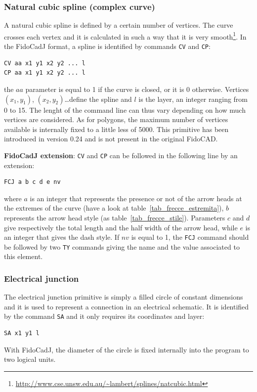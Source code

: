 \documentclass[10pt,a4paper,twoside]{scrreprt}
\begin{document}
\subsubsection{Natural cubic spline (complex curve)}
A natural cubic spline is defined by a certain number of vertices. The curve crosses each vertex and it is calculated in such a way that it is very smooth\footnote{ \href{http://www.cse.unsw.edu.au/~lambert/splines/natcubic.html}{http://www.cse.unsw.edu.au/\textasciitilde lambert/splines/natcubic.html}}. In the FidoCadJ format, a spline is identified by commands \lstinline!CV! and \lstinline!CP!:
\begin{lstlisting}
CV aa x1 y1 x2 y2 ... l
CP aa x1 y1 x2 y2 ... l
\end{lstlisting}
the $aa$ parameter is equal to 1 if the curve is closed, or it is 0 otherwise. Vertices $(x_1, y_1)$, $(x_2, y_2)$\dots define the spline and $l$ is the layer, an integer ranging from 0 to 15.
The lenght of the command line can thus vary depending on how much vertices are considered.
As for polygons, the maximum number of vertices available is internally fixed to a little less of 5000. This primitive has been introduced in version 0.24 and is not present in the original FidoCAD.

\textbf{FidoCadJ extension}: \lstinline!CV! and \lstinline!CP! can be followed in the following line by an extension:
\begin{lstlisting}
FCJ a b c d e nv
\end{lstlisting}
where $a$ is an integer that represents the presence or not of the arrow heads at the extremes of the curve (have a look at table~\ref{tab_frecce_estremita}), $b$ represents the arrow head style (as table~\ref{tab_frecce_stile}). Parameters $c$ and $d$ give respectively the total length and the half width of the arrow head, while $e$ is an integer that gives the dash style. If $nv$ is equal to 1, the \lstinline!FCJ! command should be followed by two \lstinline!TY! commands giving the name and the value associated to this element.

\subsubsection{Electrical junction}
The electrical junction primitive is simply a filled
circle of constant dimensions and it is used to represent a connection
in an electrical schematic. It is identified by the command \lstinline!SA!
and it only requires its coordinates and layer:
\begin{lstlisting}
SA x1 y1 l
\end{lstlisting}
With FidoCadJ, the diameter of the circle
is fixed internally into the program to two logical units.
\end{document}
